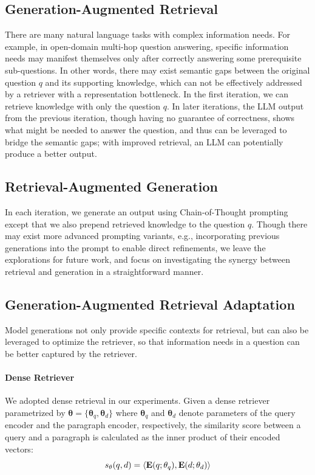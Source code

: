 \documentclass[11pt]{article}
\begin{document}
\subsection{Generation-Augmented Retrieval}

There are many natural language tasks with complex information needs.
For example, in open-domain multi-hop question answering, specific information needs may manifest themselves only after correctly answering some prerequisite sub-questions.
In other words, there may exist semantic gaps between the original question $q$ and its supporting knowledge, which can not be effectively addressed by a retriever with a representation bottleneck.
In the first iteration, we can retrieve knowledge with only the question $q$.
In later iterations, the LLM output from the previous iteration, though having no guarantee of correctness, shows what might be needed to answer the question, and thus can be leveraged to bridge the semantic gaps;
with improved retrieval, an LLM can potentially produce a better output.

\subsection{Retrieval-Augmented Generation}

In each iteration, we generate an output using Chain-of-Thought prompting except that we also prepend retrieved knowledge to the question $q$.
Though there may exist more advanced prompting variants, e.g., incorporating previous generations into the prompt to enable direct refinements, we leave the explorations for future work, and focus on investigating the synergy between retrieval and generation in a straightforward manner.

\subsection{Generation-Augmented Retrieval Adaptation}
\label{sec:retrieval_adaptation}

Model generations not only provide specific contexts for retrieval, but can also be leveraged to optimize the retriever, so that information needs in a question can be better captured by the retriever.

\paragraph{Dense Retriever}
We adopted dense retrieval in our experiments.
Given a dense retriever parametrized by $\mathbf{\theta} = \{\mathbf{\theta}_q, \mathbf{\theta}_d\}$ where $\mathbf{\theta}_q$ and $\mathbf{\theta}_d$ denote parameters of the query encoder and the paragraph encoder, respectively, the similarity score between a query and a paragraph is calculated as the inner product of their encoded vectors:
\begin{equation}
\small
    s_{\mathbf{\theta}}(q, d) = \langle \mathbf{E}(q;\mathbf{\theta}_q), \mathbf{E}(d; \mathbf{\theta}_d) \rangle
\end{equation}
\end{document}
